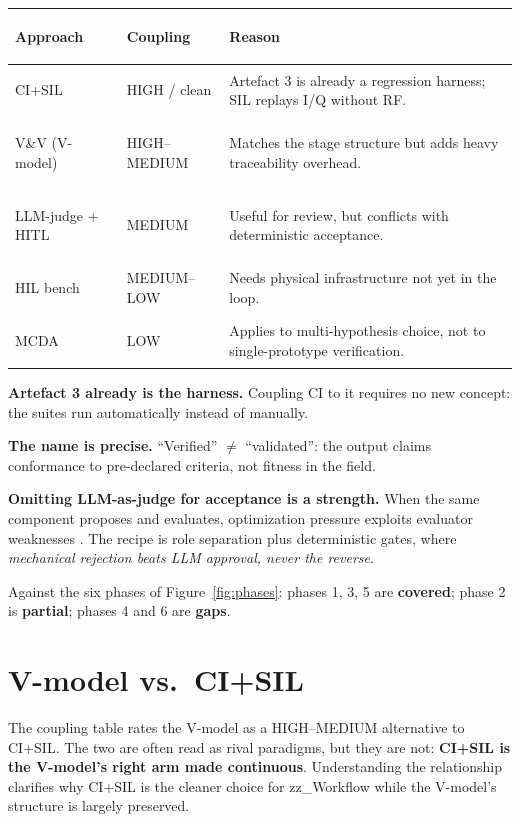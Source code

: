 \documentclass[11pt,a4paper]{article}
\begin{document}
\begin{table}[htbp]
\centering
\caption{Coupling of each validation methodology with zz\_Workflow.}
\label{tab:coupling}
\small
{}
\begin{longtable}{@{}>{\bfseries\raggedright}p{30mm}>{\raggedright}p{28mm}>{\raggedright\arraybackslash}p{75mm}@{}}
\rowcolor{headbg}\textbf{Approach} & \textbf{Coupling} & \textbf{Reason}\\
\endhead
CI+SIL & HIGH / clean & Artefact 3 is already a regression harness; SIL replays I/Q without RF.\\
V\&V (V-model) & HIGH--MEDIUM & Matches the stage structure but adds heavy traceability overhead.\\
LLM-judge + HITL & MEDIUM & Useful for review, but conflicts with deterministic acceptance.\\
HIL bench & MEDIUM--LOW & Needs physical infrastructure not yet in the loop.\\
MCDA & LOW & Applies to multi-hypothesis choice, not to single-prototype verification.\\
\end{longtable}
\end{table}

\textbf{Artefact 3 already is the harness.} Coupling CI to it requires no new concept: the
suites run automatically instead of manually.

\textbf{The name is precise.} ``Verified'' $\ne$ ``validated'': the output claims
conformance to pre-declared criteria, not fitness in the field.

\textbf{Omitting LLM-as-judge for acceptance is a strength.} When the same component
proposes and evaluates, optimization pressure exploits evaluator weaknesses
\cite{judge2026}. The recipe is role separation plus deterministic gates, where
\emph{mechanical rejection beats LLM approval, never the reverse}.

Against the six phases of Figure~\ref{fig:phases}: phases 1, 3, 5 are \textbf{covered};
phase 2 is \textbf{partial}; phases 4 and 6 are \textbf{gaps}.

\section{V-model vs.\ CI+SIL}

The coupling table rates the V-model as a HIGH--MEDIUM alternative to CI+SIL. The two
are often read as rival paradigms, but they are not: \textbf{CI+SIL is the V-model's
right arm made continuous}. Understanding the relationship clarifies why CI+SIL is the
cleaner choice for zz\_Workflow while the V-model's structure is largely preserved.
\end{document}
